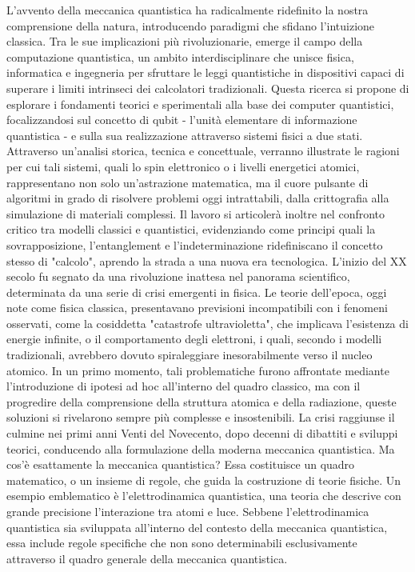 \documentclass[a4paper,12pt]{report}
\theoremstyle{plain}
\begin{document}
L'avvento della meccanica quantistica ha radicalmente ridefinito la nostra comprensione della natura, introducendo paradigmi che sfidano l'intuizione classica. Tra le sue implicazioni più rivoluzionarie, emerge il campo della computazione quantistica, un ambito interdisciplinare che unisce fisica, informatica e ingegneria per sfruttare le leggi quantistiche in dispositivi capaci di superare i limiti intrinseci dei calcolatori tradizionali. 
Questa ricerca si propone di esplorare i fondamenti teorici e sperimentali alla base dei computer quantistici, focalizzandosi sul concetto di qubit - l'unità elementare di informazione quantistica - e sulla sua realizzazione attraverso sistemi fisici a due stati. 
Attraverso un'analisi storica, tecnica e concettuale, verranno illustrate le ragioni per cui tali sistemi, quali lo spin elettronico o i livelli energetici atomici, rappresentano non solo un'astrazione matematica, ma il cuore pulsante di algoritmi in grado di risolvere problemi oggi intrattabili, dalla crittografia alla simulazione di materiali complessi. 
Il lavoro si articolerà inoltre nel confronto critico tra modelli classici e quantistici, evidenziando come principi quali la sovrapposizione, l'entanglement e l'indeterminazione ridefiniscano il concetto stesso di "calcolo", aprendo la strada a una nuova era tecnologica.
L'inizio del XX secolo fu segnato da una rivoluzione inattesa nel panorama scientifico, determinata da una serie di crisi emergenti in fisica. 
Le teorie dell'epoca, oggi note come fisica classica, presentavano previsioni incompatibili con i fenomeni osservati, come la cosiddetta "catastrofe ultravioletta", che implicava l'esistenza di energie infinite, o il comportamento degli elettroni, i quali, secondo i modelli tradizionali, avrebbero dovuto spiraleggiare inesorabilmente verso il nucleo atomico. 
In un primo momento, tali problematiche furono affrontate mediante l'introduzione di ipotesi ad hoc all'interno del quadro classico, ma con il progredire della comprensione della struttura atomica e della radiazione, queste soluzioni si rivelarono sempre più complesse e insostenibili. La crisi raggiunse il culmine nei primi anni Venti del Novecento, dopo decenni di dibattiti e sviluppi teorici, conducendo alla formulazione della moderna meccanica quantistica.
Ma cos'è esattamente la meccanica quantistica? Essa costituisce un quadro matematico, o un insieme di regole, che guida la costruzione di teorie fisiche. Un esempio emblematico è l'elettrodinamica quantistica, una teoria che descrive con grande precisione l'interazione tra atomi e luce. Sebbene l'elettrodinamica quantistica sia sviluppata all'interno del contesto della meccanica quantistica, essa include regole specifiche che non sono determinabili esclusivamente attraverso il quadro generale della meccanica quantistica.
\end{document}
